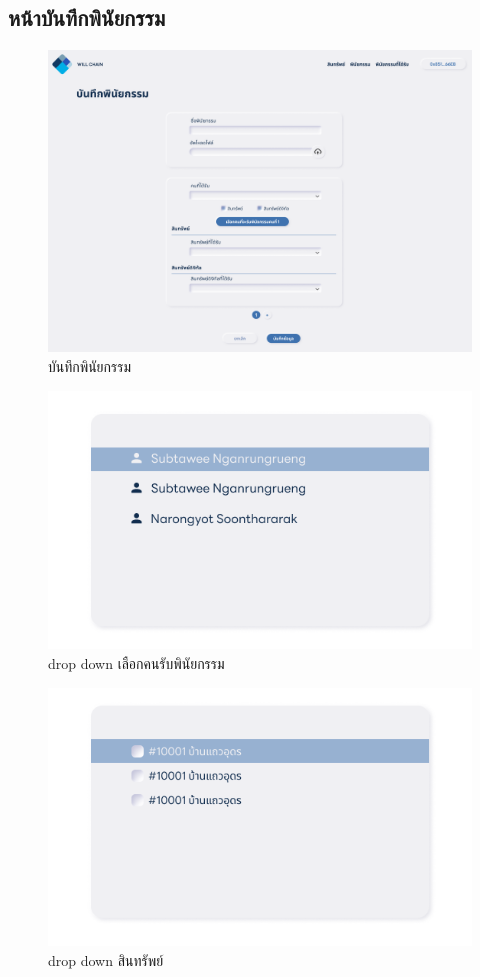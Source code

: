 \documentclass[12pt,oneside,openright,a4paper]{cpe-thai-project}
\begin{document}
\subsection{หน้าบันทึกพินัยกรรม}
		\begin{figure}[!thb]
			\centering
			\includegraphics[scale=0.2]{saveWillReal}
			\caption{บันทึกพินัยกรรม}
		\end{figure}
		\FloatBarrier
		\begin{figure}[!thb]
			\centering
			\includegraphics[scale=0.25]{dropdown1}
			\caption{drop down เลือกคนรับพินัยกรรม}
		\end{figure}
		\FloatBarrier
		\begin{figure}[!thb]
			\centering
			\includegraphics[scale=0.25]{dropdown2}
			\caption{drop down สินทรัพย์}
		\end{figure}
\end{document}
